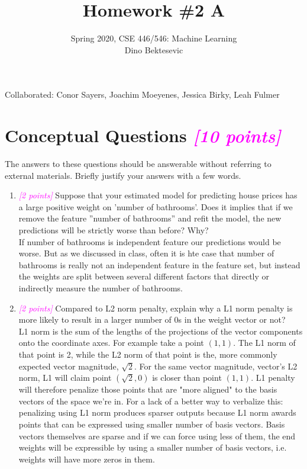 \documentclass{article}
\date{{}}
\newcommand{\1}{\mathbf{1}}
\newcommand{\points}[1]{\small\textcolor{magenta}{\emph{[#1 points]}} \normalsize}
\begin{document}
\title{Homework \#2 A}
\author{\normalsize{Spring 2020, CSE 446/546: Machine Learning}\\
\normalsize{Dino Bektesevic}}
\maketitle

Collaborated: Conor Sayers, Joachim Moeyenes, Jessica Birky, Leah Fulmer

\section*{Conceptual Questions \points{10} }
The answers to these questions should be answerable without referring to external materials.  Briefly justify your answers with a few words.
\begin{enumerate}
    \item \points{2} Suppose that your estimated model for predicting house prices has a large positive weight on ’number of bathrooms’. Does it implies that if we remove the feature ”number of bathrooms” and refit the model, the new predictions will be strictly worse than before?  Why?\\
    If number of bathrooms is independent feature our predictions would be worse. But as we discussed in class, often it is hte case that number of bathrooms is really not an independent feature in the feature set, but instead the weights are split between several different factors that directly or indirectly measure the number of bathrooms. 
        
    \item \points{2} Compared to L2 norm penalty, explain why a L1 norm penalty is more likely to result in a larger number of 0s in the weight vector or not?\\
    L1 norm is the sum of the lengths of the projections of the vector components onto the coordinate axes. For example take a point $(1, 1)$. The L1 norm of that point is 2, while the L2 norm of that point is the, more commonly expected vector magnitude, $\sqrt2$. For the same vector magnitude, vector's L2 norm, L1 will claim point $(\sqrt 2, 0)$ is closer than point $(1, 1)$. L1 penalty will therefore penalize those points that are "more aligned" to the basis vectors of the space we're in. For a lack of a better way to verbalize this: penalizing using L1 norm produces sparser outputs because L1 norm awards points that can be expressed using smaller number of basis vectors. Basis vectors themselves are sparse and if we can force using less of them, the end weights will be expressible by using a smaller number of basis vectors, i.e. weights will have more zeros in them.
        

\end{enumerate}
\end{document}
